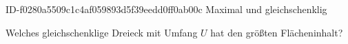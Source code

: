 \begin{exercise}
      {ID-f0280a5509c1c4af059893d5f39eedd0ff0ab00c}
      {Maximal und gleichschenklig}
  \ifproblem\problem\par
    Welches gleichschenklige Dreieck mit Umfang $U$ hat den größten Flächeninhalt?
  \fi
\end{exercise}
